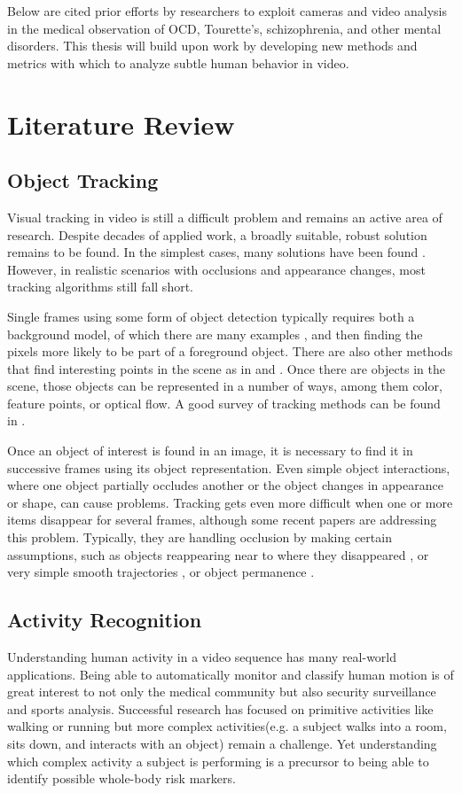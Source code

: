 \documentclass[11pt]{article}
\newcounter{list}
\begin{document}
Below are cited prior efforts by researchers to exploit cameras and video analysis in the medical observation of OCD, Tourette's, schizophrenia, and other mental disorders.  This thesis will build upon work by developing new methods and metrics with which to analyze subtle human behavior in video.

\section{Literature Review}
\subsection{Object Tracking}
Visual tracking in video is still a difficult problem and remains an active area of research. Despite decades of applied work, a broadly suitable, robust solution remains to be found. In the simplest cases, many solutions have been found \cite{comaniciu2002} \cite{bradski98}. However, in realistic scenarios with occlusions and appearance changes, most tracking algorithms still fall short.

Single frames using some form of object detection typically requires both a background model, of which there are many examples \cite{Elgammal} \cite{Stauffer}, and then finding the pixels more likely to be part of a foreground object. There are also other methods that find interesting points in the scene as in \cite{tomasi1991} and \cite{lowe2004}. Once there are objects in the scene, those objects can be represented in a number of ways, among them color, feature points, or optical flow. A good survey of tracking methods can be found in \cite{yilmaz2006}.

Once an object of interest is found in an image, it is necessary to find it in successive frames using its object representation. Even simple object interactions, where one object partially occludes another or the object changes in appearance or shape, can cause problems. Tracking gets even more difficult when one or more items disappear for several frames, although some recent papers are addressing this problem. Typically, they are handling occlusion by making certain assumptions, such as objects reappearing near to where they disappeared \cite{papadourakis2010}, or very simple smooth trajectories \cite{iraei2015}, or object permanence \cite{huang2005}.

\subsection{Activity Recognition}
Understanding human activity in a video sequence has many real-world applications. Being able to automatically monitor and classify human motion is of great interest to not only the medical community but also security surveillance and sports analysis. Successful research has focused on primitive activities like walking or running but more complex activities(e.g. a subject walks into a room, sits down, and interacts with an object) remain a challenge. Yet understanding which complex activity a subject is performing is a precursor to being able to identify possible whole-body risk markers.
\end{document}
